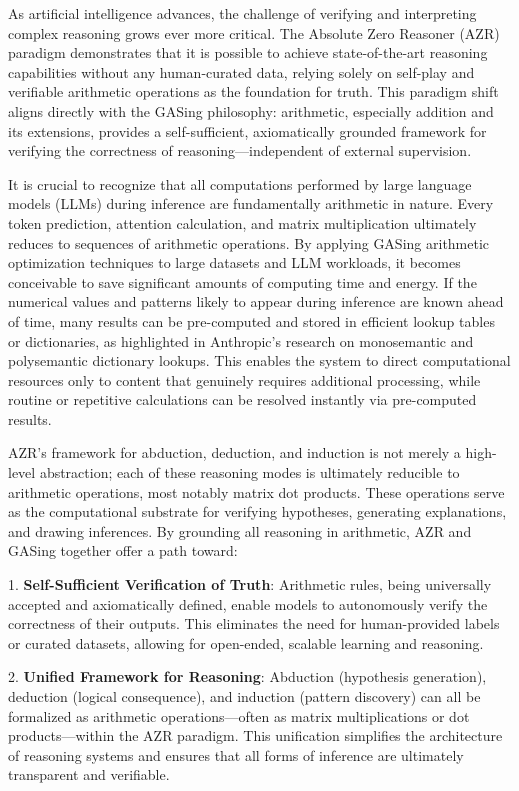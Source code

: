 As artificial intelligence advances, the challenge of verifying and interpreting complex reasoning grows ever more critical. The Absolute Zero Reasoner (AZR) paradigm demonstrates that it is possible to achieve state-of-the-art reasoning capabilities without any human-curated data, relying solely on self-play and verifiable arithmetic operations as the foundation for truth. This paradigm shift aligns directly with the GASing philosophy: arithmetic, especially addition and its extensions, provides a self-sufficient, axiomatically grounded framework for verifying the correctness of reasoning—independent of external supervision.

It is crucial to recognize that all computations performed by large language models (LLMs) during inference are fundamentally arithmetic in nature. Every token prediction, attention calculation, and matrix multiplication ultimately reduces to sequences of arithmetic operations. By applying GASing arithmetic optimization techniques to large datasets and LLM workloads, it becomes conceivable to save significant amounts of computing time and energy. If the numerical values and patterns likely to appear during inference are known ahead of time, many results can be pre-computed and stored in efficient lookup tables or dictionaries, as highlighted in Anthropic's research on monosemantic and polysemantic dictionary lookups. This enables the system to direct computational resources only to content that genuinely requires additional processing, while routine or repetitive calculations can be resolved instantly via pre-computed results.

AZR's framework for abduction, deduction, and induction is not merely a high-level abstraction; each of these reasoning modes is ultimately reducible to arithmetic operations, most notably matrix dot products. These operations serve as the computational substrate for verifying hypotheses, generating explanations, and drawing inferences. By grounding all reasoning in arithmetic, AZR and GASing together offer a path toward:

1. \textbf{Self-Sufficient Verification of Truth}: Arithmetic rules, being universally accepted and axiomatically defined, enable models to autonomously verify the correctness of their outputs. This eliminates the need for human-provided labels or curated datasets, allowing for open-ended, scalable learning and reasoning.

2. \textbf{Unified Framework for Reasoning}: Abduction (hypothesis generation), deduction (logical consequence), and induction (pattern discovery) can all be formalized as arithmetic operations—often as matrix multiplications or dot products—within the AZR paradigm. This unification simplifies the architecture of reasoning systems and ensures that all forms of inference are ultimately transparent and verifiable.

